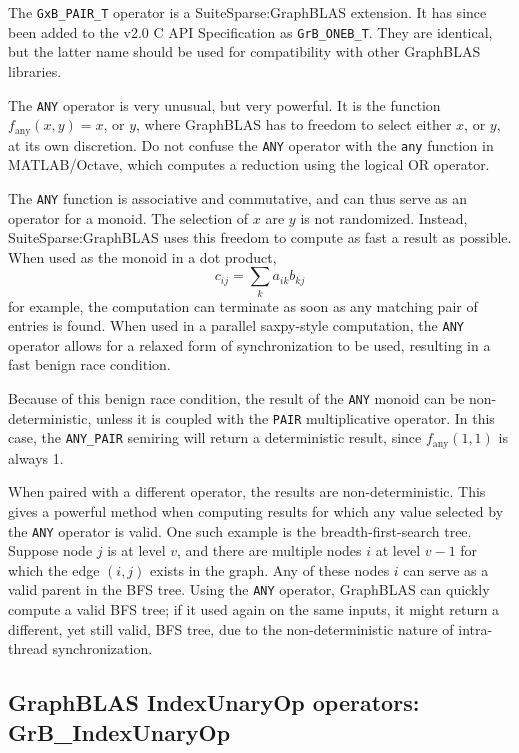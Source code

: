 \documentclass[12pt]{article}
\begin{document}
The \verb'GxB_PAIR_T' operator is a SuiteSparse:GraphBLAS extension.
It has since been added to the v2.0 C API Specification as \verb'GrB_ONEB_T'.
They are identical, but the latter name should be used for compatibility
with other GraphBLAS libraries.

The \verb'ANY' operator is very unusual, but very powerful.  It is the function
$f_{\mbox{any}}(x,y)=x$, or $y$, where GraphBLAS has to freedom to select
either $x$, or $y$, at its own discretion.  Do not confuse the \verb'ANY'
operator with the \verb'any' function in MATLAB/Octave, which computes a reduction
using the logical OR operator.

The \verb'ANY' function is associative and commutative, and can thus serve as
an operator for a monoid.  The selection of $x$ are $y$ is not randomized.
Instead, SuiteSparse:GraphBLAS uses this freedom to compute as fast a result as
possible.  When used as the monoid in a dot product, \[ c_{ij} = \sum_k a_{ik}
b_{kj} \] for example, the computation can terminate as soon as any matching
pair of entries is found.  When used in a parallel saxpy-style computation, the
\verb'ANY' operator allows for a relaxed form of synchronization to be used,
resulting in a fast benign race condition.

Because of this benign race condition, the result of the \verb'ANY' monoid can
be non-deterministic, unless it is coupled with the \verb'PAIR' multiplicative
operator.  In this case, the \verb'ANY_PAIR' semiring will return a
deterministic result, since $f_{\mbox{any}}(1,1)$ is always 1.

When paired with a different operator, the results are non-deterministic.  This
gives a powerful method when computing results for which any value selected by
the \verb'ANY' operator is valid.  One such example is the breadth-first-search
tree.  Suppose node $j$ is at level $v$, and there are multiple nodes $i$ at
level $v-1$ for which the edge $(i,j)$ exists in the graph.  Any of these nodes
$i$ can serve as a valid parent in the BFS tree.  Using the \verb'ANY'
operator, GraphBLAS can quickly compute a valid BFS tree; if it used again on
the same inputs, it might return a different, yet still valid, BFS tree, due to
the non-deterministic nature of intra-thread synchronization.

\newpage
\subsection{GraphBLAS IndexUnaryOp operators: {\sf GrB\_IndexUnaryOp}} %
\label{idxunop}
\end{document}
